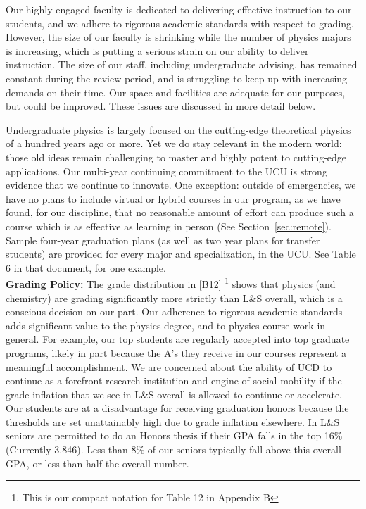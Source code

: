 \documentclass[12pt]{article}
\begin{document}
\noindent
Our highly-engaged faculty is dedicated to delivering effective instruction to our students, and we adhere to rigorous academic standards with respect to grading.  However, the size of our faculty is shrinking while the number of physics majors is increasing, which is putting a serious strain on our ability to deliver instruction.  The size of our staff, including undergraduate advising, has remained constant during the review period, and is struggling to keep up with increasing demands on their time.  Our space and facilities are adequate for our purposes, but could be improved.  These issues are discussed in more detail below.

Undergraduate physics is largely focused on the
cutting-edge theoretical physics of a hundred years ago or more.  Yet
we do stay relevant in the modern world: those old ideas remain
challenging to master and highly potent to cutting-edge applications.
Our multi-year continuing commitment to the UCU is strong evidence
that we continue to innovate.  One exception: outside of emergencies,
we have no plans to include virtual or hybrid courses in our program,
as we have found, for our discipline, that no reasonable amount of
effort can produce such a course which is as effective as learning in
person (See Section~\ref{sec:remote}).  Sample four-year graduation
plans (as well as two year plans for transfer students) are provided
for every major and specialization, in the UCU.  See Table 6 in that
document, for one example.\\[3pt]

\noindent
{\bf Grading Policy:} The grade distribution in [B12]
\footnote{This is our compact notation for Table 12 in Appendix B}
shows that physics (and chemistry) are grading significantly more strictly than
L\&S overall, which is a conscious decision on our part.  Our
adherence to rigorous academic standards adds significant value to the
physics degree, and to physics course work in general.  For example,
our top students are regularly accepted into top graduate programs,
likely in part because the A's they receive in our courses represent a
meaningful accomplishment.  We are concerned about the ability of UCD
to continue as a forefront research institution and engine of social
mobility if the grade inflation that we see in L\&S overall is allowed
to continue or accelerate.  Our students are at a disadvantage for
receiving graduation honors because the thresholds are set
unattainably high due to grade inflation elsewhere.  In L\&S seniors 
are permitted to do an Honors thesis if their GPA falls
in the top 16\% (Currently 3.846).  Less than 8\% of our seniors
typically fall above this overall GPA, or less than half the overall
number.\\[3pt]
\end{document}
